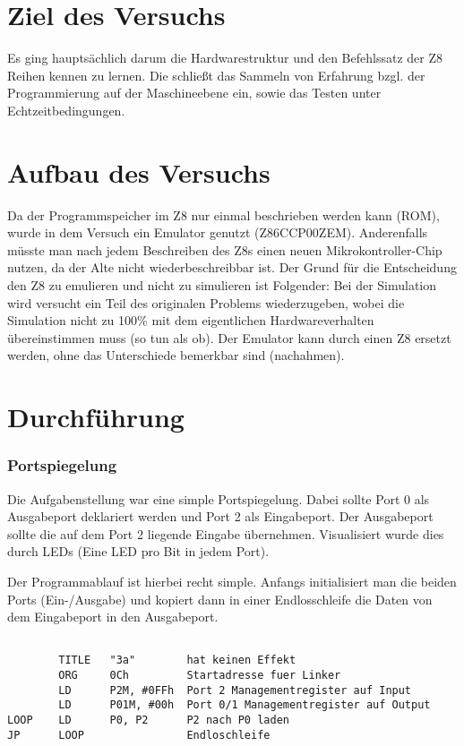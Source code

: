 \documentclass[a4paper,11pt]{article}
\begin{document}
\section{Ziel des Versuchs}
Es ging hauptsächlich darum die Hardwarestruktur und den Befehlssatz der Z8 Reihen kennen zu lernen. Die schließt das Sammeln von Erfahrung bzgl. der Programmierung auf der Maschineebene ein, sowie das Testen unter Echtzeitbedingungen. 

\section{Aufbau des Versuchs}
Da der Programmspeicher im Z8 nur einmal beschrieben werden kann (ROM), wurde in dem Versuch ein Emulator genutzt (Z86CCP00ZEM). Anderenfalls müsste man nach jedem Beschreiben des Z8s einen neuen Mikrokontroller-Chip nutzen, da der Alte nicht wiederbeschreibbar ist. 
Der Grund für die Entscheidung den Z8 zu emulieren und nicht zu simulieren ist Folgender: 
Bei der Simulation wird versucht ein Teil des originalen Problems wiederzugeben, wobei die Simulation nicht zu 100\% mit dem eigentlichen Hardwareverhalten übereinstimmen muss (so tun als ob). 
Der Emulator kann durch einen Z8 ersetzt werden, ohne das Unterschiede bemerkbar sind (nachahmen). 

\section{Durchführung}
\setcounter{section}{3}
\setcounter{subsection}{2}
\renewcommand{\thesubsubsection}{\thesubsection \alph{subsubsection}}
\subsubsection{Portspiegelung}
Die Aufgabenstellung war eine simple Portspiegelung. Dabei sollte Port 0 als Ausgabeport deklariert werden und Port 2 als Eingabeport. 
Der Ausgabeport sollte die auf dem Port 2 liegende Eingabe übernehmen. 
Visualisiert wurde dies durch LEDs (Eine LED pro Bit in jedem Port). 

Der Programmablauf ist hierbei recht simple. Anfangs initialisiert man die beiden Ports (Ein-/Ausgabe) und kopiert dann in einer Endlosschleife die Daten von dem Eingabeport in den Ausgabeport. 

\begin{lstlisting}

        TITLE   "3a"        hat keinen Effekt
        ORG     0Ch         Startadresse fuer Linker
        LD      P2M, #0FFh  Port 2 Managementregister auf Input
        LD      P01M, #00h  Port 0/1 Managementregister auf Output
LOOP    LD      P0, P2      P2 nach P0 laden
JP      LOOP                Endloschleife

\end{lstlisting}
\end{document}
